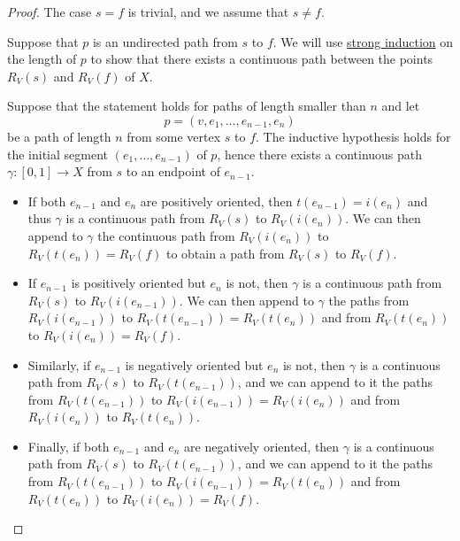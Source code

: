 \begin{proof}
  The case \( s = f \) is trivial, and we assume that \( s \neq f \).

   Suppose that \( p \) is an undirected path from \( s \) to \( f \). We will use \hyperref[rem:induction/well_founded]{strong induction} on the length of \( p \) to show that there exists a continuous path between the points \( R_V(s) \) and \( R_V(f)  \) of \( X \).

  Suppose that the statement holds for paths of length smaller than \( n \) and let
  \begin{equation*}
    p = (v, e_1, \ldots, e_{n-1}, e_n)
  \end{equation*}
  be a path of length \( n \) from some vertex \( s \) to \( f \). The inductive hypothesis holds for the initial segment \( (e_1, \ldots, e_{n-1}) \) of \( p \), hence there exists a continuous path \( \gamma: [0, 1] \to X \) from \( s \) to an endpoint of \( e_{n-1} \).
  \begin{itemize}
    \item If both \( e_{n-1} \) and \( e_n \) are positively oriented, then \( t(e_{n-1}) = i(e_n) \) and thus \( \gamma \) is a continuous path from \( R_V(s)  \) to \( R_V(i(e_n)) \). We can then append to \( \gamma \) the continuous path from \( R_V(i(e_n)) \) to \( R_V(t(e_n)) = R_V(f)  \) to obtain a path from \( R_V(s)  \) to \( R_V(f)  \).

    \item If \( e_{n-1} \) is positively oriented but \( e_n \) is not, then \( \gamma \) is a continuous path from \( R_V(s)  \) to \( R_V(i(e_{n-1})) \). We can then append to \( \gamma \) the paths from \( R_V(i(e_{n-1})) \) to \( R_V(t(e_{n-1})) = R_V(t(e_n)) \) and from \( R_V(t(e_n)) \) to \( R_V(i(e_n)) = R_V(f)  \).

    \item Similarly, if \( e_{n-1} \) is negatively oriented but \( e_n \) is not, then \( \gamma \) is a continuous path from \( R_V(s)  \) to \( R_V(t(e_{n-1})) \), and we can append to it the paths from \( R_V(t(e_{n-1})) \) to \( R_V(i(e_{n-1})) = R_V(i(e_n)) \) and from \( R_V(i(e_n)) \) to \( R_V(t(e_n)) \).

    \item Finally, if both \( e_{n-1} \) and \( e_n \) are negatively oriented, then \( \gamma \) is a continuous path from \( R_V(s)  \) to \( R_V(t(e_{n-1})) \), and we can append to it the paths from \( R_V(t(e_{n-1})) \) to \( R_V(i(e_{n-1})) = R_V(t(e_n)) \) and from \( R_V(t(e_n)) \) to \( R_V(i(e_n)) = R_V(f)  \).
  \end{itemize}


\end{proof}
